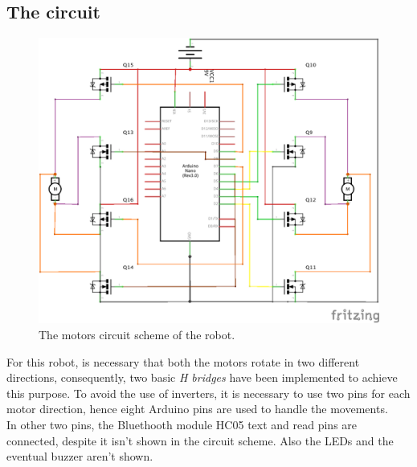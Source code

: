 \subsection{The circuit}
\begin{figure}[h!]
	\centering
	\hspace*{-0.15 \textwidth}\includegraphics[width= 1.3\textwidth]
	{files/images/ReceiverScheme}
	\caption{The motors circuit scheme of the robot.}
\end{figure}
For this robot, is necessary that both the motors rotate in two different directions, consequently, two basic \textit{H bridges} have been implemented to achieve this purpose. To avoid the use of inverters, it is necessary to use two pins for each motor direction, hence eight Arduino pins are used to handle the movements.\\
In other two pins, the Bluethooth module HC05 text and read pins are connected, despite it isn't shown in the circuit scheme. Also the LEDs and the eventual buzzer aren't shown.